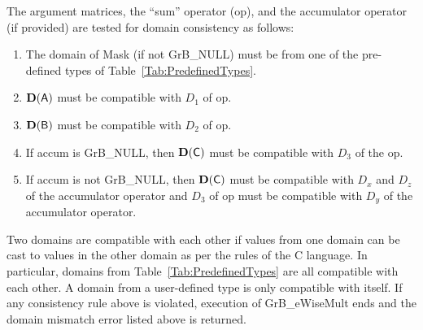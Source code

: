The argument matrices, the ``sum'' operator ({\sf op}), and the accumulator 
operator (if provided) are tested for domain consistency as follows:
\begin{enumerate}
	\item The domain of {\sf Mask} (if not {\sf GrB\_NULL}) must be from one of the pre-defined types of Table~\ref{Tab:PredefinedTypes}.

	\item $\bold{D}({\sf A})$ must be compatible with $D_1$ of {\sf op}.

	\item $\bold{D}({\sf B})$ must be compatible with $D_2$ of {\sf op}.

	\item If {\sf accum} is {\sf GrB\_NULL}, then $\bold{D}({\sf C})$ must be 
    compatible with $D_3$ of the {\sf op}.

	\item If {\sf accum} is not {\sf GrB\_NULL}, then $\bold{D}({\sf C})$ must be
    compatible with $D_x$ and $D_z$ of the accumulator operator and $D_3$ of
    {\sf op} must be compatible with $D_y$ of the accumulator operator.
\end{enumerate}
Two domains are compatible with each other if values from one domain can be cast 
to values in the other domain as per the rules of the C language.
In particular, domains from Table~\ref{Tab:PredefinedTypes} are all compatible 
with each other. A domain from a user-defined type is only compatible with itself.
If any consistency rule above is violated, execution of {\sf GrB\_eWiseMult} ends
and the domain mismatch error listed above is returned.

